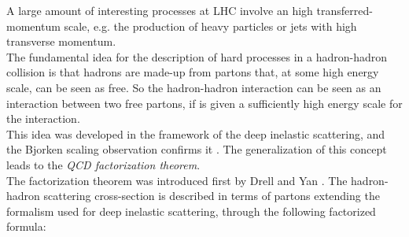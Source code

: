 A large amount of interesting processes at LHC involve an high transferred-momentum scale, e.g. the production of heavy particles or jets with high transverse momentum. 
\\
The fundamental idea for the description of hard processes in a hadron-hadron collision is that hadrons are made-up from partons that, at some high energy scale, can be seen as free. So the hadron-hadron interaction can be seen as an interaction between two free partons, if is given a sufficiently high energy scale for the interaction.
\\
This idea was developed in the framework of the deep inelastic scattering, and the Bjorken scaling observation confirms it \cite{Bjorken:1968dy}. The generalization of this concept leads to the \textit{QCD factorization theorem}. 
\\   
The factorization theorem was introduced first by Drell and Yan \cite{DRELL1971578}. 
The hadron-hadron scattering cross-section is described in terms of partons extending the formalism used for deep inelastic scattering, through the following factorized formula:

